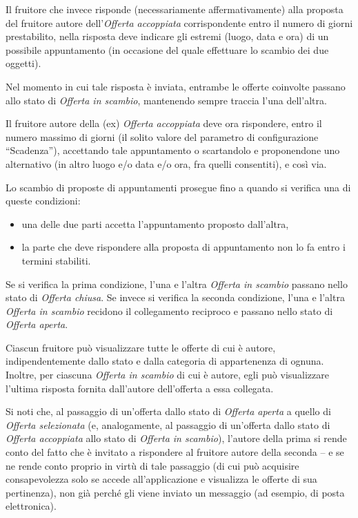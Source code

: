 Il fruitore che invece risponde (necessariamente affermativamente) alla proposta del fruitore autore dell’\textit{Offerta accoppiata} corrispondente entro il numero di giorni prestabilito, nella risposta deve indicare gli estremi (luogo, data e ora) di un possibile appuntamento (in occasione del quale effettuare lo scambio dei due oggetti). 

Nel momento in cui tale risposta è inviata, entrambe le offerte coinvolte passano allo stato di \textit{Offerta in scambio}, mantenendo sempre traccia l’una dell’altra. 

Il fruitore autore della (ex) \textit{Offerta accoppiata} deve ora rispondere, entro il numero massimo di giorni (il solito valore del parametro di configurazione “Scadenza”), accettando tale appuntamento o scartandolo e proponendone uno alternativo (in altro luogo e/o data e/o ora, fra quelli consentiti), e così via. 

Lo scambio di proposte di appuntamenti prosegue fino a quando si verifica una di queste condizioni: 
\begin{itemize}
    \item una delle due parti accetta l’appuntamento proposto dall’altra,
    \item la parte che deve rispondere alla proposta di appuntamento non lo fa entro i termini stabiliti.
\end{itemize}
Se si verifica la prima condizione, l’una e l’altra \textit{Offerta in scambio} passano nello stato di \textit{Offerta chiusa}.\newline
Se invece si verifica la seconda condizione, l’una e l’altra \textit{Offerta in scambio} recidono il collegamento reciproco e passano nello stato di \textit{Offerta aperta}.\newline

Ciascun fruitore può visualizzare tutte le offerte di cui è autore, indipendentemente dallo stato e dalla categoria di appartenenza di ognuna.\newline
Inoltre, per ciascuna \textit{Offerta in scambio} di cui è autore, egli può visualizzare l’ultima risposta fornita dall’autore dell’offerta a essa collegata. \newline

Si noti che, al passaggio di un’offerta dallo stato di \textit{Offerta aperta} a quello di \textit{Offerta selezionata} (e, analogamente, al passaggio di un’offerta dallo stato di \textit{Offerta accoppiata} allo stato di \textit{Offerta in scambio}), l’autore della prima si rende conto del fatto che è invitato a rispondere al fruitore autore della seconda – e se ne rende conto proprio in virtù di tale passaggio (di cui può acquisire consapevolezza solo se accede all’applicazione e visualizza le offerte di sua pertinenza), non già perché gli viene inviato un messaggio (ad esempio, di posta elettronica). 


